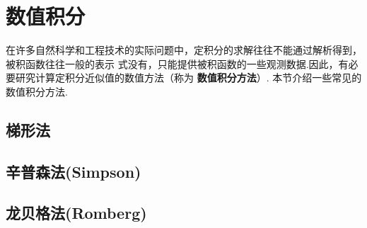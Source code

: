 \section{数值积分}
在许多自然科学和工程技术的实际问题中，定积分的求解往往不能通过解析得到，被积函数往往一般的表示
式没有，只能提供被积函数的一些观测数据.因此，有必要研究计算定积分近似值的数值方法（称为
\textbf{数值积分方法}）.
本节介绍一些常见的数值积分方法.

\subsection{梯形法}

\subsection{辛普森法(Simpson)}

\subsection{龙贝格法(Romberg)}
